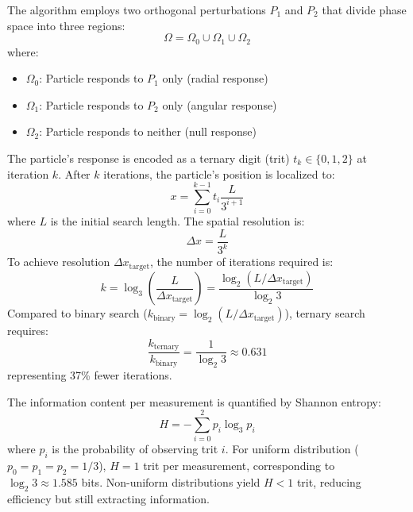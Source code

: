\documentclass[twocolumn,10pt]{article}
\begin{document}
The algorithm employs two orthogonal perturbations $P_1$ and $P_2$ that divide 
phase space into three regions:
%
\begin{equation}
\Omega = \Omega_0 \cup \Omega_1 \cup \Omega_2
\label{eq:partition}
\end{equation}
%
where:
%
\begin{itemize}
\item $\Omega_0$: Particle responds to $P_1$ only (radial response)
\item $\Omega_1$: Particle responds to $P_2$ only (angular response)
\item $\Omega_2$: Particle responds to neither (null response)
\end{itemize}
%
The particle's response is encoded as a ternary digit (trit) $t_k \in \{0, 1, 2\}$ 
at iteration $k$. After $k$ iterations, the particle's position is localized to:
%
\begin{equation}
x = \sum_{i=0}^{k-1} t_i \frac{L}{3^{i+1}}
\label{eq:ternary_position}
\end{equation}
%
where $L$ is the initial search length. The spatial resolution is:
%
\begin{equation}
\Delta x = \frac{L}{3^k}
\label{eq:resolution}
\end{equation}
%
To achieve resolution $\Delta x_{\text{target}}$, the number of iterations required is:
%
\begin{equation}
k = \log_3 \left( \frac{L}{\Delta x_{\text{target}}} \right) = \frac{\log_2(L/\Delta x_{\text{target}})}{\log_2 3}
\label{eq:iterations}
\end{equation}
%
Compared to binary search ($k_{\text{binary}} = \log_2(L/\Delta x_{\text{target}})$), 
ternary search requires:
%
\begin{equation}
\frac{k_{\text{ternary}}}{k_{\text{binary}}} = \frac{1}{\log_2 3} \approx 0.631
\label{eq:speedup}
\end{equation}
%
representing 37\% fewer iterations.

The information content per measurement is quantified by Shannon entropy:
%
\begin{equation}
H = -\sum_{i=0}^{2} p_i \log_3 p_i
\label{eq:shannon_entropy}
\end{equation}
%
where $p_i$ is the probability of observing trit $i$. For uniform distribution 
($p_0 = p_1 = p_2 = 1/3$), $H = 1$ trit per measurement, corresponding to 
$\log_2 3 \approx 1.585$ bits. Non-uniform distributions yield $H < 1$ trit, 
reducing efficiency but still extracting information.
\end{document}
